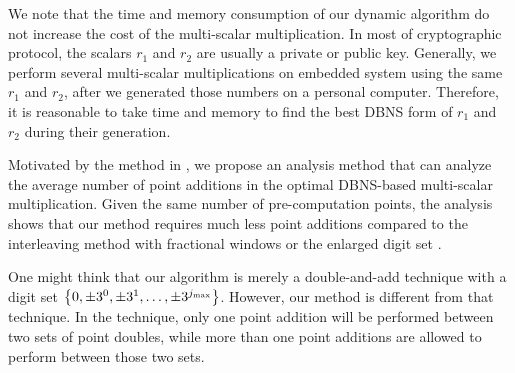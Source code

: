 We note that the time and memory consumption of our dynamic algorithm do not increase the cost of the multi-scalar multiplication. In most of cryptographic protocol, the scalars $r_1$ and $r_2$ are usually a private or public key. Generally, we perform several multi-scalar multiplications on embedded system using the same $r_1$ and $r_2$, after we generated those numbers on a personal computer. Therefore, it is reasonable to take time and memory to find the best DBNS form of $r_1$ and $r_2$ during their generation.

Motivated by the method in \cite{analysisMethod}, we propose an analysis method that can analyze the average number of point additions in the optimal DBNS-based multi-scalar multiplication. Given the same number of pre-computation points, the analysis shows that our method requires much less point additions compared to the interleaving method with fractional windows \cite{fractional} or the enlarged digit set \cite{analysisMethod}.

One might think that our algorithm is merely a double-and-add technique with a digit set $\left\{0, \pm 3^0, \pm 3^1, \dots, \pm 3^{j_{\rm max}} \right\}$. However, our method is different from that technique. In the technique, only one point addition will be performed between two sets of point doubles, while more than one point additions are allowed to perform between those two sets.
